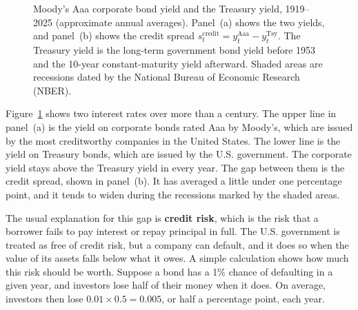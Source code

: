 \begin{figure}[htbp]
{%
}
\caption{Moody's Aaa corporate bond yield and the Treasury yield, 1919--2025 (approximate annual averages). Panel~(a) shows the two yields, and panel~(b) shows the credit spread $s_t^{\text{credit}} = y_t^{\text{Aaa}} - y_t^{\text{Tsy}}$. The Treasury yield is the long-term government bond yield before 1953 and the 10-year constant-maturity yield afterward. Shaded areas are recessions dated by the National Bureau of Economic Research (NBER).}
\label{fig:aaa-treasury-spread}
\end{figure}

Figure~\ref{fig:aaa-treasury-spread} shows two interest rates over more than a century. The upper line in panel~(a) is the yield on corporate bonds rated Aaa by Moody's, which are issued by the most creditworthy companies in the United States. The lower line is the yield on Treasury bonds, which are issued by the U.S. government. The corporate yield stays above the Treasury yield in every year. The gap between them is the credit spread, shown in panel~(b). It has averaged a little under one percentage point, and it tends to widen during the recessions marked by the shaded areas.

The usual explanation for this gap is \textbf{credit risk}, which is the risk that a borrower fails to pay interest or repay principal in full. The U.S. government is treated as free of credit risk, but a company can default, and it does so when the value of its assets falls below what it owes. A simple calculation shows how much this risk should be worth. Suppose a bond has a 1\% 
chance of defaulting in a given year, and investors lose half of their money when it does. On average, investors then lose $0.01 \times 0.5 = 0.005$, or half a percentage point, each year. 

